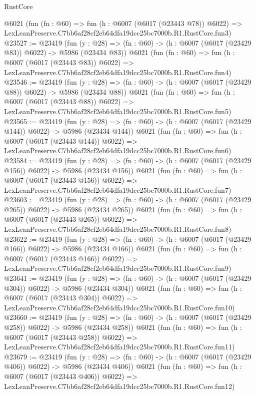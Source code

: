 \begin{lexlean}{RustCore}
\begin{coremodule}
    @6021
    (fun (fn : @60) =>
    fun (h : @6007 (@6017 (@23443 @78)) @6022) =>
    LexLeanPreserve.C7bb6af28cf2eb64dfa19dcc25bc7000b.R1.RustCore.fun3)
@23527 := @23419
    (fun (y : @28) => (fn : @60) -> (h : @6007 (@6017 (@23429 @83)) @6022) -> @5986 (@23434 @83))
    @6021
    (fun (fn : @60) =>
    fun (h : @6007 (@6017 (@23443 @83)) @6022) =>
    LexLeanPreserve.C7bb6af28cf2eb64dfa19dcc25bc7000b.R1.RustCore.fun4)
@23546 := @23419
    (fun (y : @28) => (fn : @60) -> (h : @6007 (@6017 (@23429 @88)) @6022) -> @5986 (@23434 @88))
    @6021
    (fun (fn : @60) =>
    fun (h : @6007 (@6017 (@23443 @88)) @6022) =>
    LexLeanPreserve.C7bb6af28cf2eb64dfa19dcc25bc7000b.R1.RustCore.fun5)
@23565 := @23419
    (fun (y : @28) => (fn : @60) -> (h : @6007 (@6017 (@23429 @144)) @6022) -> @5986 (@23434 @144))
    @6021
    (fun (fn : @60) =>
    fun (h : @6007 (@6017 (@23443 @144)) @6022) =>
    LexLeanPreserve.C7bb6af28cf2eb64dfa19dcc25bc7000b.R1.RustCore.fun6)
@23584 := @23419
    (fun (y : @28) => (fn : @60) -> (h : @6007 (@6017 (@23429 @156)) @6022) -> @5986 (@23434 @156))
    @6021
    (fun (fn : @60) =>
    fun (h : @6007 (@6017 (@23443 @156)) @6022) =>
    LexLeanPreserve.C7bb6af28cf2eb64dfa19dcc25bc7000b.R1.RustCore.fun7)
@23603 := @23419
    (fun (y : @28) => (fn : @60) -> (h : @6007 (@6017 (@23429 @265)) @6022) -> @5986 (@23434 @265))
    @6021
    (fun (fn : @60) =>
    fun (h : @6007 (@6017 (@23443 @265)) @6022) =>
    LexLeanPreserve.C7bb6af28cf2eb64dfa19dcc25bc7000b.R1.RustCore.fun8)
@23622 := @23419
    (fun (y : @28) => (fn : @60) -> (h : @6007 (@6017 (@23429 @166)) @6022) -> @5986 (@23434 @166))
    @6021
    (fun (fn : @60) =>
    fun (h : @6007 (@6017 (@23443 @166)) @6022) =>
    LexLeanPreserve.C7bb6af28cf2eb64dfa19dcc25bc7000b.R1.RustCore.fun9)
@23641 := @23419
    (fun (y : @28) => (fn : @60) -> (h : @6007 (@6017 (@23429 @304)) @6022) -> @5986 (@23434 @304))
    @6021
    (fun (fn : @60) =>
    fun (h : @6007 (@6017 (@23443 @304)) @6022) =>
    LexLeanPreserve.C7bb6af28cf2eb64dfa19dcc25bc7000b.R1.RustCore.fun10)
@23660 := @23419
    (fun (y : @28) => (fn : @60) -> (h : @6007 (@6017 (@23429 @258)) @6022) -> @5986 (@23434 @258))
    @6021
    (fun (fn : @60) =>
    fun (h : @6007 (@6017 (@23443 @258)) @6022) =>
    LexLeanPreserve.C7bb6af28cf2eb64dfa19dcc25bc7000b.R1.RustCore.fun11)
@23679 := @23419
    (fun (y : @28) => (fn : @60) -> (h : @6007 (@6017 (@23429 @406)) @6022) -> @5986 (@23434 @406))
    @6021
    (fun (fn : @60) =>
    fun (h : @6007 (@6017 (@23443 @406)) @6022) =>
    LexLeanPreserve.C7bb6af28cf2eb64dfa19dcc25bc7000b.R1.RustCore.fun12)

\end{coremodule}
\end{lexlean}
